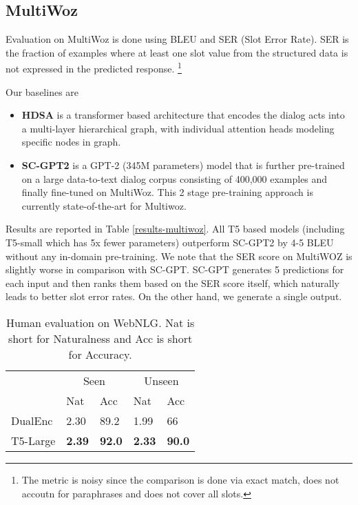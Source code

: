 \documentclass[11pt,a4paper]{article}
\begin{document}
\subsection{MultiWoz}
Evaluation on MultiWoz is done using BLEU and SER (Slot Error Rate). SER is the fraction of examples where at least one slot value from the structured data is not expressed in the predicted response. \footnote{The metric is noisy since the comparison is done via exact match, does not accoutn for paraphrases and does not cover all slots.} 
\par Our baselines are 
\begin{itemize}
    \item \textbf{HDSA} \cite{chen2019semantically} is a transformer based architecture that encodes the dialog acts into a multi-layer hierarchical graph, with individual attention heads modeling specific nodes in graph. 
    \item \textbf{SC-GPT2}  \cite{peng2020few} is a GPT-2 (345M parameters) model that is further pre-trained on a large data-to-text dialog corpus consisting of 400,000 examples and finally fine-tuned on MultiWoz. This 2 stage pre-training approach is currently state-of-the-art for Multiwoz.
\end{itemize} 

\par Results are reported in Table \ref{results-multiwoz}. All T5 based models (including T5-small which has 5x fewer parameters) outperform SC-GPT2 by 4-5 BLEU without any in-domain pre-training. We note that the SER score on MultiWOZ is slightly worse in comparison with SC-GPT.  SC-GPT generates 5 predictions for each input and then ranks them based on the SER score itself, which naturally leads to better slot error rates. On the other hand, we generate a single output.

\begin{table}[ht]
\centering
\begin{tabular}{l|ll|ll}
\hline
& \multicolumn{2}{c|}{Seen} & \multicolumn{2}{c}{Unseen}  \\
& Nat & Acc & Nat & Acc \\\hline
DualEnc & 2.30 & 89.2 & 1.99 & 66 \\
T5-Large &  \textbf{2.39} & \textbf{92.0} & \textbf{2.33} & \textbf{90.0} \\ \hline 
\end{tabular}
\caption{Human evaluation on WebNLG. Nat is short for Naturalness and Acc is short for Accuracy.}
\label{results-human-webnlg}
\end{table}
\end{document}
